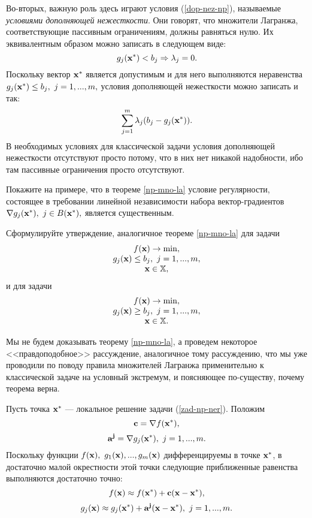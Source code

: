     Во-вторых, важную роль здесь играют условия (\ref{dop-nez-np}),
    называемые \emph{условиями дополняющей нежесткости}. Они
    говорят, что множители Лагранжа, соответствующие пассивным
    ограничениям, должны равняться нулю. Их эквивалентным образом
    можно записать в следующем виде:
    \[g_{j}(\mathbf{x^{*}})<b_{j}\Rightarrow\lambda_{j}=0.\]
    Поскольку вектор $\mathbf{x^{*}}$ является допустимым и для него
    выполняются неравенства $g_{j}(\mathbf{x^{*}})\leq b_{j}, \
    j=1,...,m,$ условия дополняющей нежесткости можно записать и
    так:
    \[\sum_{j=1}^{m}\lambda_{j}(b_{j}-g_{j}(\mathbf{x^{*}})).\]
    В необходимых условиях для классической задачи условия
    дополняющей нежесткости отсутствуют просто потому, что в них нет
    никакой надобности, ибо там пассивные ограничения просто
    отсутствуют.

\begin{exer}
    Покажите на примере, что в теореме \ref{np-mno-la} условие
    регулярности, состоящее в
    требовании линейной независимости набора вектор-градиентов
    $\nabla g_{j}(\mathbf{x^{*}}), \ j\in B(\mathbf{x^{*}}),$ является
    существенным.
\end{exer}

\begin{exer}
    Сформулируйте утверждение, аналогичное теореме \ref{np-mno-la}
    для задачи
    \[
\begin{array}{c}
      f(\mathbf{x})\rightarrow\min, \\
      g_{j}(\mathbf{x})\leq b_{j}, \ j=1,...,m, \\
    \mathbf{x}\in\mathbb{X},
\end{array}
\]
    и для задачи
\[
\begin{array}{c}
      f(\mathbf{x})\rightarrow\min, \\
      g_{j}(\mathbf{x})\geq b_{j}, \ j=1,...,m, \\
    \mathbf{x}\in\mathbb{X}.
\end{array}
\]
\end{exer}


    Мы не будем доказывать теорему \ref{np-mno-la}, а проведем
    некоторое <<правдоподобное>> рассуждение, аналогичное тому
    рассуждению, что мы уже проводили по поводу правила множителей
    Лагранжа применительно к классической задаче на условный
    экстремум, и поясняющее по-существу, почему теорема верна.


Пусть точка
    $\mathbf{x^{*}}$ --- локальное решение задачи (\ref{zad-np-ner}).
    Положим
    \[\mathbf{c}=\nabla f(\mathbf{x^{*}}),\]
    \[\vc{a^{j}}=\nabla g_{j}(\vc{x^{*}}), \ j=1,...,m.\]
    Поскольку функции
    $f(\vc{x}), \ g_{1}(\vc{x}),...,g_{m}(\vc{x})$
    дифференцируемы в точке $\mathbf{x^{*}}$,  в
    достаточно малой окрестности этой точки следующие приближенные
    равенства выполняются достаточно точно:
    \[f(\mathbf{x})\approx f(\mathbf{x^{*}})+\mathbf{c}(\mathbf{x}-\mathbf{x^{*}}),\]
    \[g_{j}(\vc{x})\approx g_{j}(\vc{x^{*}})+\vc{a^{j}}(\vc{x}-\vc{x^{*}}), \ j=1,...,m.\]

